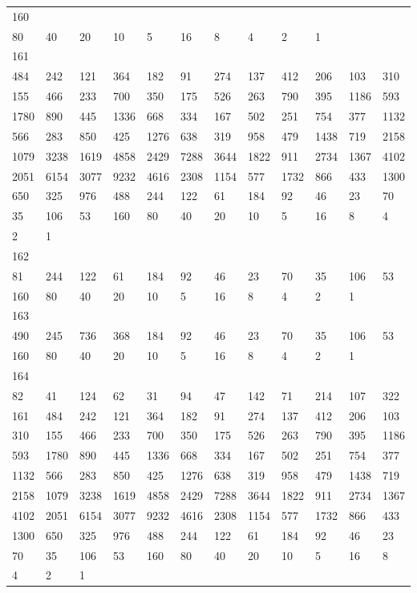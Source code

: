 \begin{longtable}{llllllllllll}
160&&&&&&&&&&&\\
80& 40& 20& 10& 5& 16& 8& 4& 2& 1& \\

161&&&&&&&&&&&\\
484& 242& 121& 364& 182& 91& 274& 137& 412& 206& 103& 310\\
155& 466& 233& 700& 350& 175& 526& 263& 790& 395& 1186& 593\\
1780& 890& 445& 1336& 668& 334& 167& 502& 251& 754& 377& 1132\\
566& 283& 850& 425& 1276& 638& 319& 958& 479& 1438& 719& 2158\\
1079& 3238& 1619& 4858& 2429& 7288& 3644& 1822& 911& 2734& 1367& 4102\\
2051& 6154& 3077& 9232& 4616& 2308& 1154& 577& 1732& 866& 433& 1300\\
650& 325& 976& 488& 244& 122& 61& 184& 92& 46& 23& 70\\
35& 106& 53& 160& 80& 40& 20& 10& 5& 16& 8& 4\\
2& 1& \\

162&&&&&&&&&&&\\
81& 244& 122& 61& 184& 92& 46& 23& 70& 35& 106& 53\\
160& 80& 40& 20& 10& 5& 16& 8& 4& 2& 1& \\

163&&&&&&&&&&&\\
490& 245& 736& 368& 184& 92& 46& 23& 70& 35& 106& 53\\
160& 80& 40& 20& 10& 5& 16& 8& 4& 2& 1& \\

164&&&&&&&&&&&\\
82& 41& 124& 62& 31& 94& 47& 142& 71& 214& 107& 322\\
161& 484& 242& 121& 364& 182& 91& 274& 137& 412& 206& 103\\
310& 155& 466& 233& 700& 350& 175& 526& 263& 790& 395& 1186\\
593& 1780& 890& 445& 1336& 668& 334& 167& 502& 251& 754& 377\\
1132& 566& 283& 850& 425& 1276& 638& 319& 958& 479& 1438& 719\\
2158& 1079& 3238& 1619& 4858& 2429& 7288& 3644& 1822& 911& 2734& 1367\\
4102& 2051& 6154& 3077& 9232& 4616& 2308& 1154& 577& 1732& 866& 433\\
1300& 650& 325& 976& 488& 244& 122& 61& 184& 92& 46& 23\\
70& 35& 106& 53& 160& 80& 40& 20& 10& 5& 16& 8\\
4& 2& 1& \\


\end{longtable}
